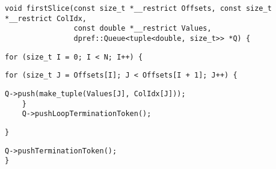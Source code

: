 \begin{lstlisting}[style=cppcode]
void firstSlice(const size_t *__restrict Offsets, const size_t *__restrict ColIdx,
                const double *__restrict Values,
                dpref::Queue<tuple<double, size_t>> *Q) {
\end{lstlisting}\vspace{-\baselineskip}

\begin{lstlisting}[style=cppcode, backgroundcolor=\color{yellow!15}, firstnumber=last]
  for (size_t I = 0; I < N; I++) {
\end{lstlisting}\vspace{-\baselineskip}

\begin{lstlisting}[style=cppcode, backgroundcolor=\color{red!15}, firstnumber=last]
    for (size_t J = Offsets[I]; J < Offsets[I + 1]; J++) {
\end{lstlisting}\vspace{-\baselineskip}

\begin{lstlisting}[style=cppcode, firstnumber=last]
      Q->push(make_tuple(Values[J], ColIdx[J]));
    }
    Q->pushLoopTerminationToken();
\end{lstlisting}\vspace{-\baselineskip}

\begin{lstlisting}[style=cppcode, backgroundcolor=\color{yellow!15}, firstnumber=last]
  }
\end{lstlisting}\vspace{-\baselineskip}

\begin{lstlisting}[style=cppcode, firstnumber=last]
  Q->pushTerminationToken();
}
\end{lstlisting}\vspace{-\baselineskip}
